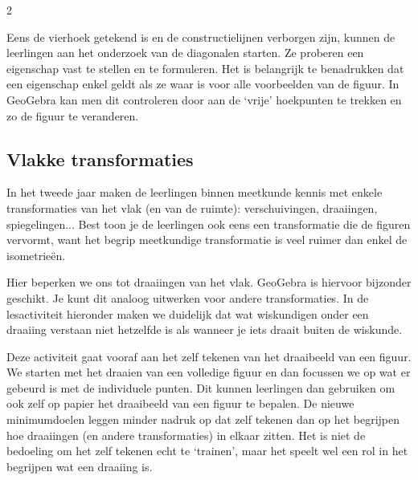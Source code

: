 \begin{multicols}{2}


Eens de vierhoek getekend is en de constructielijnen verborgen zijn, kunnen de leerlingen aan het onderzoek van de diagonalen starten. Ze proberen een eigenschap vast te stellen en te formuleren. Het is belangrijk te benadrukken dat een eigenschap enkel geldt als ze waar is voor alle voorbeelden van de figuur. In GeoGebra kan men dit controleren door aan de `vrije' hoekpunten te trekken en zo de figuur te veranderen.

\subsection{Vlakke transformaties}

In het tweede jaar maken de leerlingen binnen meetkunde kennis met enkele transformaties van het vlak (en van de ruimte): verschuivingen, draaiingen, spiegelingen... Best toon je de leerlingen ook eens een transformatie die de figuren vervormt, want het begrip meetkundige transformatie is veel ruimer dan enkel de isometrieën.

Hier beperken we ons tot draaiingen van het vlak. GeoGebra is hiervoor bijzonder geschikt. Je kunt dit analoog uitwerken voor andere transformaties. In de lesactiviteit hieronder maken we duidelijk dat wat wiskundigen onder een draaiing verstaan niet hetzelfde is als wanneer je iets draait buiten de wiskunde.
 
 Deze activiteit gaat vooraf aan het zelf tekenen van het draaibeeld van een figuur. We starten met het draaien van een volledige figuur en dan focussen we op wat er gebeurd is met de individuele punten. Dit kunnen leerlingen dan gebruiken om ook zelf op papier het draaibeeld van een figuur te bepalen. De nieuwe minimumdoelen leggen minder nadruk op dat zelf tekenen dan op het begrijpen hoe draaiingen (en andere transformaties) in elkaar zitten. Het is niet de bedoeling om het zelf tekenen echt te `trainen', maar het speelt wel een rol in het begrijpen wat een draaiing is.

\end{multicols}

